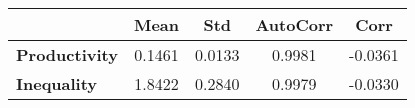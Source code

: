 \begin{tiny}\begin{tabular}{|l|c|c|c|c|}
\hline
&\textbf{Mean}&\textbf{Std}&\textbf{AutoCorr}&\textbf{Corr}\\\hline
\textbf{Productivity}&0.1461&0.0133&0.9981&-0.0361\\\hline
\textbf{Inequality}&1.8422&0.2840&0.9979&-0.0330\\\hline
\end{tabular}
\end{tiny}